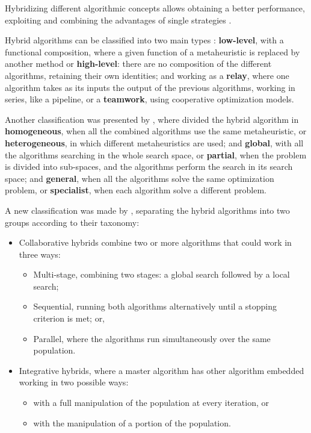 Hybridizing different algorithmic concepts allows obtaining a better performance, exploiting and combining the advantages of single strategies \cite{Blum2010}.

Hybrid algorithms can be classified into two main types \cite{talbi2002taxonomy, jourdan2009hybridizing}: \textbf{low-level}, with a functional composition, where a given function of a metaheuristic is replaced by another method or \textbf{high-level}: there are no composition of the  different algorithms, retaining their own identities; and working as a \textbf{relay}, where one algorithm takes as its inputs the output of the previous algorithms, working in series, like a pipeline, or a \textbf{teamwork}, using cooperative optimization models.

Another classification was presented by , where divided the hybrid algorithm in \textbf{homogeneous}, when all the combined algorithms use the same metaheuristic, or \textbf{heterogeneous}, in which different metaheuristics are used; and \textbf{global}, with all the algorithms searching in the whole search space, or \textbf{partial}, when the problem is divided into sub-spaces, and the algorithms perform the search in its search space; and \textbf{general}, when all the algorithms solve the same optimization problem, or \textbf{specialist}, when each algorithm solve a different problem.

A new classification was made by , separating the hybrid algorithms into two groups according to their taxonomy:
\vspace{1em}
%
\begin{itemize}
    \item Collaborative hybrids combine two or more algorithms that could work in three ways:
    \vspace{1em}
    \begin{itemize}
        \item Multi-stage, combining two stages: a global search followed by a local search;
        \item Sequential, running both algorithms alternatively until a stopping criterion is met; or,
        \item Parallel, where the algorithms run simultaneously over the same population.
    \end{itemize}
    \item Integrative hybrids, where a master algorithm has other algorithm embedded working in two possible ways:
    \vspace{1em}
    \begin{itemize}
        \item with a full manipulation of the population at every iteration, or
        \item with the manipulation of a portion of the population.
    \end{itemize}
\end{itemize}

